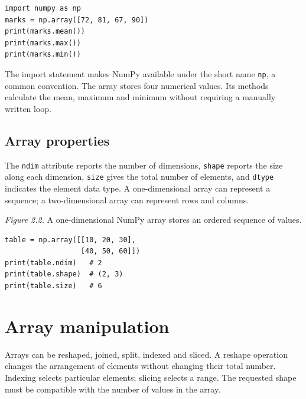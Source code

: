 \documentclass[11pt,openany,oneside]{book}
\begin{document}
\begin{lstlisting}[style=pythonstyle]
import numpy as np
marks = np.array([72, 81, 67, 90])
print(marks.mean())
print(marks.max())
print(marks.min())
\end{lstlisting}
The import statement makes NumPy available under the short name \texttt{np}, a common convention. The array stores four numerical values. Its methods calculate the mean, maximum and minimum without requiring a manually written loop.

\subsection{Array properties}
The \texttt{ndim} attribute reports the number of dimensions, \texttt{shape} reports the size along each dimension, \texttt{size} gives the total number of elements, and \texttt{dtype} indicates the element data type. A one-dimensional array can represent a sequence; a two-dimensional array can represent rows and columns.

\begin{center}
\end{center}
\textit{Figure 2.2.} A one-dimensional NumPy array stores an ordered sequence of values.

\begin{lstlisting}[style=pythonstyle]
table = np.array([[10, 20, 30],
                  [40, 50, 60]])
print(table.ndim)   # 2
print(table.shape)  # (2, 3)
print(table.size)   # 6
\end{lstlisting}

\section{Array manipulation}
Arrays can be reshaped, joined, split, indexed and sliced. A reshape operation changes the arrangement of elements without changing their total number. Indexing selects particular elements; slicing selects a range. The requested shape must be compatible with the number of values in the array.
\end{document}
